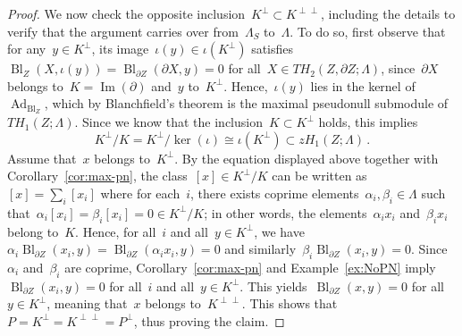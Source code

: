 \documentclass[10.9pt,a4paper]{amsart}
\theoremstyle{definition}
\theoremstyle{remark}
\newcommand{\Bl}{\operatorname{Bl}}
\newcommand{\Ad}{\operatorname{Ad}}
\newcommand{\Ima}{\operatorname{Im}}
\begin{document}
\begin{proof}

We now check the opposite inclusion~$K^{\perp}\subset K^{\perp\perp}$,
including the details to verify that the argument carries over from~$\Lambda_S$ to~$\Lambda$.
To do so, first observe that for any~$y\in K^\perp$, its image~$\iota(y)\in\iota(K^\perp)$ satisfies~$\Bl_Z(X,\iota(y))=\Bl_{\partial Z}(\partial X,y)=0$
for all~$X\in TH_2(Z,\partial Z;\Lambda)$, since~$\partial X$ belongs to~$K=\Ima(\partial)$ and~$y$ to~$K^\perp$.
Hence,~$\iota(y)$ lies in the kernel of~$\Ad_{\Bl_{Z}}$, which by Blanchfield's theorem is the maximal pseudonull submodule of~$TH_1(Z;\Lambda)$. Since we know that the inclusion~$K\subset K^\perp$ holds, this implies
\[
K^\perp/K=K^\perp/\ker(\iota)\cong\iota(K^\perp)\subset zH_1(Z;\Lambda)\,.
\]
Assume that~$x$ belongs to~$K^\perp$. By the equation displayed above together with Corollary~\ref{cor:max-pn},
the class~$[x]\in K^\perp/K$ can be written as~$[x]=\sum_i[x_i]$ where for each~$i$, there exists coprime
elements~$\alpha_i,\beta_i\in\Lambda$ such that~$\alpha_i[x_i]=\beta_i[x_i]=0\in  K^\perp/K$; in other words,
the elements~$\alpha_i x_i$ and~$\beta_i x_i$ belong to~$K$. Hence, for all~$i$ and all~$y\in K^\perp$, we have~$\alpha_i\Bl_{\partial Z}(x_i,y)=\Bl_{\partial Z}(\alpha_ix_i,y)=0$
and similarly~$\beta_i\Bl_{\partial Z}(x_i,y)=0$. Since~$\alpha_i$ and~$\beta_i$ are coprime, Corollary~\ref{cor:max-pn}
and Example~\ref{ex:NoPN} imply~$\Bl_{\partial Z}(x_i,y)=0$ for all~$i$ and all~$y\in K^\perp$.
This yields~$\Bl_{\partial Z}(x,y)=0$ for all~$y\in K^\perp$, meaning that~$x$ belongs to~$K^{\perp\perp}$.
This shows that~$P=K^\perp=K^{\perp\perp}=P^\perp$, thus proving the claim.



\end{proof}
\end{document}
